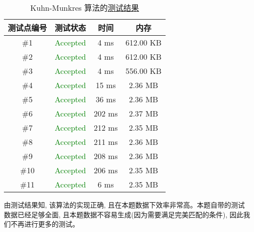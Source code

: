 \begin{table}[H]
	\centering
	\caption{Kuhn-Munkres 算法的\href{https://www.luogu.com.cn/record/195173111}{测试结果}}
	\label{tab:kuhn_munkres_test_results}
	\linewidth
	\begin{tabular}{cccc}
		\toprule
		\textbf{测试点编号} & \textbf{测试状态} & \textbf{时间} & \textbf{内存} \\
		\midrule
		\#1 & \textcolor{green}{Accepted} & 4 ms & 612.00 KB \\
		\#2 & \textcolor{green}{Accepted} & 4 ms & 612.00 KB \\
		\#3 & \textcolor{green}{Accepted} & 4 ms & 556.00 KB \\
		\#4 & \textcolor{green}{Accepted} & 15 ms & 2.36 MB \\
		\#5 & \textcolor{green}{Accepted} & 36 ms & 2.36 MB \\
		\#6 & \textcolor{green}{Accepted} & 202 ms & 2.37 MB \\
		\#7 & \textcolor{green}{Accepted} & 212 ms & 2.35 MB \\
		\#8 & \textcolor{green}{Accepted} & 211 ms & 2.36 MB \\
		\#9 & \textcolor{green}{Accepted} & 208 ms & 2.36 MB \\
		\#10 & \textcolor{green}{Accepted} & 206 ms & 2.35 MB \\
		\#11 & \textcolor{green}{Accepted} & 6 ms & 2.35 MB \\
		\bottomrule
	\end{tabular}
\end{table}

由测试结果知, 该算法的实现正确, 且在本题数据下效率非常高。本题自带的测试数据已经足够全面, 且本题数据不容易生成(因为需要满足完美匹配的条件), 因此我们不再进行更多的测试。

